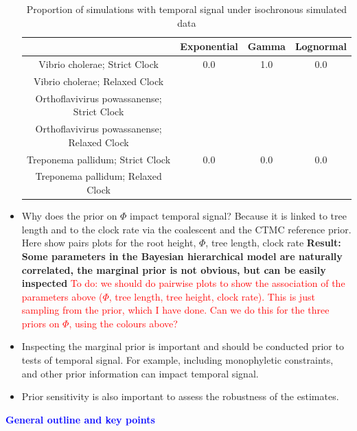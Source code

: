 \documentclass[11pt]{article}
\begin{document}
\begin{itemize}
        \begin{table}[H]
        \caption{Proportion of simulations with temporal signal under isochronous simulated data}
        \begin{center}
        \begin{tabular}{ c | c c c }
         & Exponential & Gamma & Lognormal \\ 
        \hline
        Vibrio cholerae; Strict Clock & 0.0 & 1.0 & 0.0 \\  
        Vibrio cholerae; Relaxed Clock &  &  &  \\   
        Orthoflavivirus powassanense; Strict Clock &  &  &  \\  
        Orthoflavivirus powassanense; Relaxed Clock &  &  &  \\   
        Treponema pallidum; Strict Clock & 0.0 & 0.0 & 0.0 \\  
        Treponema pallidum; Relaxed Clock &  &  & 
        \end{tabular}
        \end{center}
        \end{table}
    
	\item Why does the prior on $\Phi$ impact temporal signal? Because it is linked to tree length and to the clock rate via the coalescent and the CTMC reference prior. Here show pairs plots for the root height, $\Phi$, tree length, clock rate \textbf{Result: Some parameters in the Bayesian hierarchical model are naturally correlated, the marginal prior is not obvious, but can be easily inspected}
            \subitem \textcolor{red}{To do: we should do pairwise plots to show the association of the parameters above ($\Phi$, tree length, tree height, clock rate). This is just sampling from the prior, which I have done. Can we do this for the three priors on $\Phi$, using the colours above?}   
        
	\item Inspecting the marginal prior is important and should be conducted prior to tests of temporal signal. For example, including monophyletic constraints, and other prior information can impact temporal signal. 
	\item Prior sensitivity is also important to assess the robustness of the estimates.
 
\end{itemize}

\Large{\textbf{\textcolor{blue}{General outline and key points}}}
\end{document}
